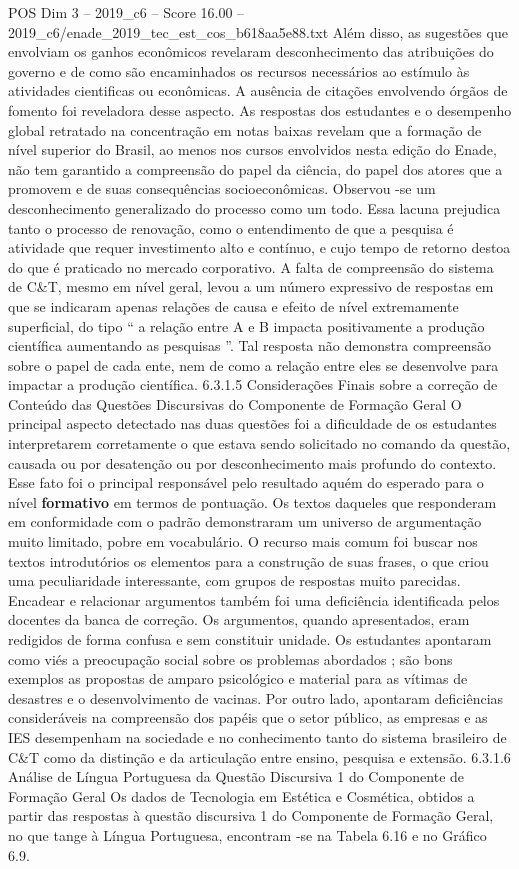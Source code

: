 \begin{textsample}{POS Dim 3 – 2019\_c6 – Score 16.00 – 2019\_c6/enade\_2019\_tec\_est\_cos\_b618aa5e88.txt}
Além disso, as sugestões que envolviam os ganhos econômicos revelaram desconhecimento das atribuições do governo e de como são encaminhados os recursos necessários ao estímulo às atividades cientificas ou econômicas.
A ausência de citações envolvendo órgãos de fomento foi reveladora desse aspecto.
As respostas dos estudantes e o desempenho global retratado na concentração em notas baixas revelam que a formação de nível superior do Brasil, ao menos nos cursos envolvidos nesta edição do Enade, não tem garantido a compreensão do papel da ciência, do papel dos atores que a promovem e de suas consequências socioeconômicas.
Observou -se um desconhecimento generalizado do processo como um todo.
Essa lacuna prejudica tanto o processo de renovação, como o entendimento de que a pesquisa é atividade que requer investimento alto e contínuo, e cujo tempo de retorno destoa do que é praticado no mercado corporativo.
A falta de compreensão do sistema de C\&T, mesmo em nível geral, levou a um número expressivo de respostas em que se indicaram apenas relações de causa e efeito de nível extremamente superficial, do tipo “ a relação entre A e B impacta positivamente a produção científica aumentando as pesquisas ”.
Tal resposta não demonstra compreensão sobre o papel de cada ente, nem de como a relação entre eles se desenvolve para impactar a produção científica. 6.3.1.5 Considerações Finais sobre a correção de Conteúdo das Questões Discursivas do Componente de Formação Geral O principal aspecto detectado nas duas questões foi a dificuldade de os estudantes interpretarem corretamente o que estava sendo solicitado no comando da questão, causada ou por desatenção ou por desconhecimento mais profundo do contexto.
Esse fato foi o principal responsável pelo resultado aquém do esperado para o nível \textbf{formativo} em termos de pontuação.
Os textos daqueles que responderam em conformidade com o padrão demonstraram um universo de argumentação muito limitado, pobre em vocabulário.
O recurso mais comum foi buscar nos textos introdutórios os elementos para a construção de suas frases, o que criou uma peculiaridade interessante, com grupos de respostas muito parecidas.
Encadear e relacionar argumentos também foi uma deficiência identificada pelos docentes da banca de correção.
Os argumentos, quando apresentados, eram redigidos de forma confusa e sem constituir unidade.
Os estudantes apontaram como viés a preocupação social sobre os problemas abordados ; são bons exemplos as propostas de amparo psicológico e material para as vítimas de desastres e o desenvolvimento de vacinas.
Por outro lado, apontaram deficiências consideráveis na compreensão dos papéis que o setor público, as empresas e as IES desempenham na sociedade e no conhecimento tanto do sistema brasileiro de C\&T como da distinção e da articulação entre ensino, pesquisa e extensão. 6.3.1.6 Análise de Língua Portuguesa da Questão Discursiva 1 do Componente de Formação Geral Os dados de Tecnologia em Estética e Cosmética, obtidos a partir das respostas à questão discursiva 1 do Componente de Formação Geral, no que tange à Língua Portuguesa, encontram -se na Tabela 6.16 e no Gráfico 6.9.

\end{textsample}
